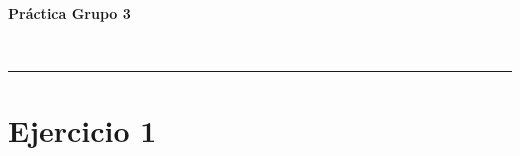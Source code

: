 \documentclass[a4paper,12pt]{article}
\begin{document}
	
	\setlength{\parindent}{0.5cm}
	\setlength{\voffset}{-2cm}
	\setlength{\hoffset}{-2cm}
	
	\begin{center}
		\begin{LARGE}
			\textbf{Práctica Grupo 3}
		\end{LARGE}
		\begin{Large}
			\\ \medskip {}
		\end{Large}
		\rule{14cm}{0.5mm}
	\end{center}
	
	
	\tableofcontents
	
	\newpage
	\section*{Ejercicio 1}
	
	
\end{document}
